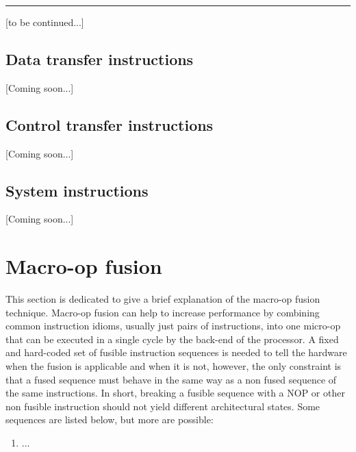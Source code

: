 \documentclass{article}
\begin{document}
            \par\noindent\rule{\textwidth}{0.4pt}

            [to be continued...]

        \subsection{Data transfer instructions}

            [Coming soon...]

        \subsection{Control transfer instructions}

            [Coming soon...]

        \subsection{System instructions}

            [Coming soon...]

    \clearpage


    \section[Macro-op fusion]{Macro-op fusion}

        \vspace{10pt}

        This section is dedicated to give a brief explanation of the macro-op fusion technique. Macro-op fusion can help to increase performance by combining common instruction idioms, usually just pairs of instructions, into one micro-op that can be executed in a single cycle by the back-end of the processor. A fixed and hard-coded set of fusible instruction sequences is needed to tell the hardware when the fusion is applicable and when it is not, however, the only constraint is that a fused sequence must behave in the same way as a non fused sequence of the same instructions. In short, breaking a fusible sequence with a NOP or other non fusible instruction should not yield different architectural states. Some sequences are listed below, but more are possible:

        \begin{enumerate}

            \item ...

        \end{enumerate}
\end{document}
